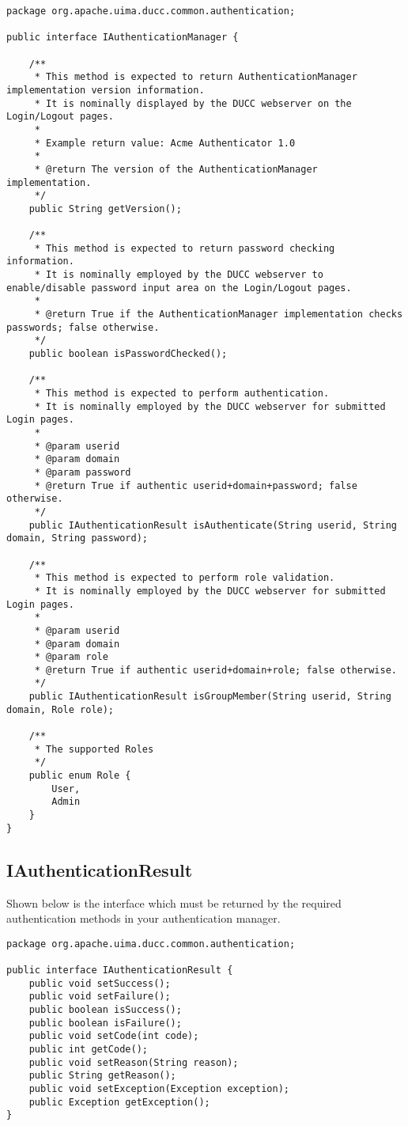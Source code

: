     \begin{verbatim}
package org.apache.uima.ducc.common.authentication;

public interface IAuthenticationManager {
    
    /**
     * This method is expected to return AuthenticationManager implementation version information.  
     * It is nominally displayed by the DUCC webserver on the Login/Logout pages.
     * 
     * Example return value: Acme Authenticator 1.0
     * 
     * @return The version of the AuthenticationManager implementation.
     */
    public String getVersion();
    
    /**
     * This method is expected to return password checking information.  
     * It is nominally employed by the DUCC webserver to enable/disable password input area on the Login/Logout pages.
     * 
     * @return True if the AuthenticationManager implementation checks passwords; false otherwise.
     */
    public boolean isPasswordChecked();
    
    /**
     * This method is expected to perform authentication.
     * It is nominally employed by the DUCC webserver for submitted Login pages.
     * 
     * @param userid
     * @param domain
     * @param password
     * @return True if authentic userid+domain+password; false otherwise.
     */
    public IAuthenticationResult isAuthenticate(String userid, String domain, String password);
    
    /**
     * This method is expected to perform role validation.
     * It is nominally employed by the DUCC webserver for submitted Login pages.
     * 
     * @param userid
     * @param domain
     * @param role
     * @return True if authentic userid+domain+role; false otherwise.
     */
    public IAuthenticationResult isGroupMember(String userid, String domain, Role role);
    
    /**
     * The supported Roles
     */
    public enum Role {
        User,
        Admin
    }
}
    \end{verbatim}


\subsection{IAuthenticationResult}
    
    Shown below is the interface which must be returned by the required
    authentication methods in your authentication manager.
    
    \begin{verbatim}
package org.apache.uima.ducc.common.authentication;
    
public interface IAuthenticationResult {
    public void setSuccess();
    public void setFailure();
    public boolean isSuccess();
    public boolean isFailure();
    public void setCode(int code);
    public int getCode();
    public void setReason(String reason);
    public String getReason();
    public void setException(Exception exception);
    public Exception getException();
}
    \end{verbatim}
    
